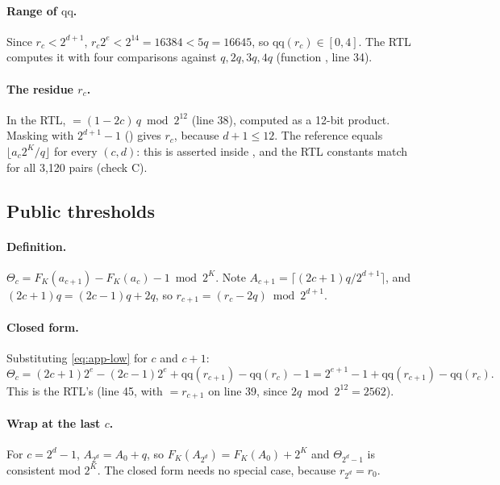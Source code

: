 \paragraph{Range of $\mathrm{qq}$.} Since $r_c < 2^{d+1}$, $r_c 2^e < 2^{14} = 16384 < 5q = 16645$, so $\mathrm{qq}(r_c) \in [0, 4]$. The RTL computes it with four comparisons against $q, 2q, 3q, 4q$ (function , line 34).

\paragraph{The residue $r_c$.} In the RTL,  $= (1 - 2c)\,q \bmod 2^{12}$ (line 38), computed as a 12-bit product. Masking with $2^{d+1} - 1$ () gives $r_c$, because $d + 1 \le 12$. The reference  equals $\lfloor a_c 2^K/q \rfloor$ for every $(c, d)$: this is asserted inside , and the RTL constants match for all 3,120 pairs (check C).

\subsection{Public thresholds}\label{app:math-theta}
\paragraph{Definition.} $\Theta_c = F_K(a_{c+1}) - F_K(a_c) - 1 \bmod 2^K$. Note $A_{c+1} = \lceil (2c+1)q/2^{d+1} \rceil$, and $(2c+1)q = (2c-1)q + 2q$, so $r_{c+1} = (r_c - 2q) \bmod 2^{d+1}$.

\paragraph{Closed form.} Substituting \cref{eq:app-low} for $c$ and $c+1$:
\begin{equation}\label{eq:app-theta}
  \Theta_c = (2c+1)2^e - (2c-1)2^e + \mathrm{qq}(r_{c+1}) - \mathrm{qq}(r_c) - 1 = 2^{e+1} - 1 + \mathrm{qq}(r_{c+1}) - \mathrm{qq}(r_c) .
\end{equation}
This is the RTL's  (line 45, with  $= r_{c+1}$ on line 39, since $2q \bmod 2^{12} = 2562$).

\paragraph{Wrap at the last $c$.} For $c = 2^d - 1$, $A_{2^d} = A_0 + q$, so $F_K(A_{2^d}) = F_K(A_0) + 2^K$ and $\Theta_{2^d - 1}$ is consistent mod $2^K$. The closed form needs no special case, because $r_{2^d} = r_0$.

